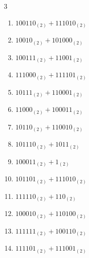 \begin{multicols}{3}
\begin{enumerate}
  \item $100110_{(2)} + 111010_{(2)}$


  \item $10010_{(2)} + 101000_{(2)}$


  \item $100111_{(2)} + 11001_{(2)}$


  \item $111000_{(2)} + 111101_{(2)}$


  \item $10111_{(2)} + 110001_{(2)}$


  \item $11000_{(2)} + 100011_{(2)}$


  \item $10110_{(2)} + 110010_{(2)}$


  \item $101110_{(2)} + 1011_{(2)}$


\columnbreak %

  \item $100011_{(2)} + 1_{(2)}$


  \item $101101_{(2)} + 111010_{(2)}$


  \item $111110_{(2)} + 110_{(2)}$


  \item $100010_{(2)} + 110100_{(2)}$


  \item $111111_{(2)} + 100110_{(2)}$


  \item $111101_{(2)} + 111001_{(2)}$


\end{enumerate}
\end{multicols}
